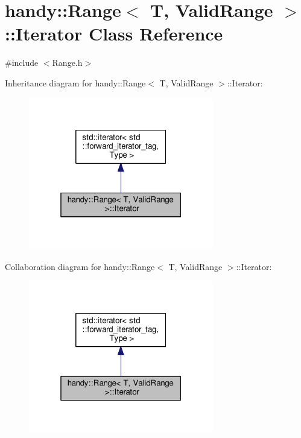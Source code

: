 \hypertarget{classhandy_1_1Range_1_1Iterator}{}\section{handy\+:\+:Range$<$ T, Valid\+Range $>$\+:\+:Iterator Class Reference}
\label{classhandy_1_1Range_1_1Iterator}


{\ttfamily \#include $<$Range.\+h$>$}



Inheritance diagram for handy\+:\+:Range$<$ T, Valid\+Range $>$\+:\+:Iterator\+:\nopagebreak
\begin{figure}[H]
\begin{center}
\leavevmode
\includegraphics[width=229pt]{classhandy_1_1Range_1_1Iterator__inherit__graph}
\end{center}
\end{figure}


Collaboration diagram for handy\+:\+:Range$<$ T, Valid\+Range $>$\+:\+:Iterator\+:\nopagebreak
\begin{figure}[H]
\begin{center}
\leavevmode
\includegraphics[width=229pt]{classhandy_1_1Range_1_1Iterator__coll__graph}
\end{center}
\end{figure}
